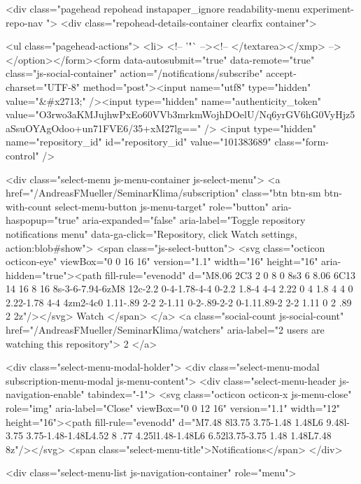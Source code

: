   <div class="pagehead repohead instapaper_ignore readability-menu experiment-repo-nav  ">
    <div class="repohead-details-container clearfix container">

      <ul class="pagehead-actions">
  <li>
        <!-- '"` --><!-- </textarea></xmp> --></option></form><form data-autosubmit="true" data-remote="true" class="js-social-container" action="/notifications/subscribe" accept-charset="UTF-8" method="post"><input name="utf8" type="hidden" value="&#x2713;" /><input type="hidden" name="authenticity_token" value="O3rwo3aKMJujhwPxEo60VVb3mrkmWojhDOelU/Nq6yrGV6hG0VyHjz5aSsuOYAgOdoo+un71FVE6/35+xM27lg==" />      <input type="hidden" name="repository_id" id="repository_id" value="101383689" class="form-control" />

        <div class="select-menu js-menu-container js-select-menu">
          <a href="/AndreasFMueller/SeminarKlima/subscription"
            class="btn btn-sm btn-with-count select-menu-button js-menu-target"
            role="button"
            aria-haspopup="true"
            aria-expanded="false"
            aria-label="Toggle repository notifications menu"
            data-ga-click="Repository, click Watch settings, action:blob#show">
            <span class="js-select-button">
                <svg class="octicon octicon-eye" viewBox="0 0 16 16" version="1.1" width="16" height="16" aria-hidden="true"><path fill-rule="evenodd" d="M8.06 2C3 2 0 8 0 8s3 6 8.06 6C13 14 16 8 16 8s-3-6-7.94-6zM8 12c-2.2 0-4-1.78-4-4 0-2.2 1.8-4 4-4 2.22 0 4 1.8 4 4 0 2.22-1.78 4-4 4zm2-4c0 1.11-.89 2-2 2-1.11 0-2-.89-2-2 0-1.11.89-2 2-2 1.11 0 2 .89 2 2z"/></svg>
                Watch
            </span>
          </a>
          <a class="social-count js-social-count"
            href="/AndreasFMueller/SeminarKlima/watchers"
            aria-label="2 users are watching this repository">
            2
          </a>

        <div class="select-menu-modal-holder">
          <div class="select-menu-modal subscription-menu-modal js-menu-content">
            <div class="select-menu-header js-navigation-enable" tabindex="-1">
              <svg class="octicon octicon-x js-menu-close" role="img" aria-label="Close" viewBox="0 0 12 16" version="1.1" width="12" height="16"><path fill-rule="evenodd" d="M7.48 8l3.75 3.75-1.48 1.48L6 9.48l-3.75 3.75-1.48-1.48L4.52 8 .77 4.25l1.48-1.48L6 6.52l3.75-3.75 1.48 1.48L7.48 8z"/></svg>
              <span class="select-menu-title">Notifications</span>
            </div>

              <div class="select-menu-list js-navigation-container" role="menu">

